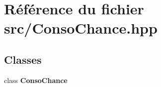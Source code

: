 \section{Référence du fichier src/\-Conso\-Chance.hpp}
\label{_conso_chance_8hpp}
\subsection*{Classes}
\begin{DoxyCompactItemize}
\item 
class {\bf Conso\-Chance}
\end{DoxyCompactItemize}

